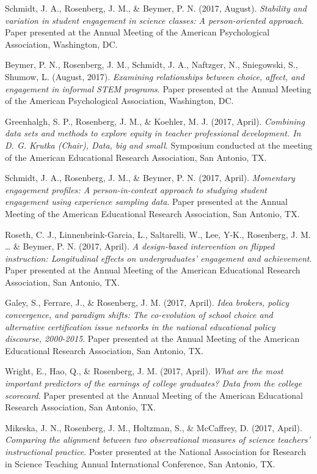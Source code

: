 \documentclass[]{article}
\begin{document}
Schmidt, J. A., Rosenberg, J. M., \& Beymer, P. N. (2017, August).
\emph{Stability and variation in student engagement in science classes:
A person-oriented approach}. Paper presented at the Annual Meeting of
the American Psychological Association, Washington, DC.

Beymer, P. N., Rosenberg, J. M., Schmidt, J. A., Naftzger, N.,
Sniegowski, S., Shumow, L. (August, 2017). \emph{Examining relationships
between choice, affect, and engagement in informal STEM programs}. Paper
presented at the Annual Meeting of the American Psychological
Association, Washington, DC.

Greenhalgh, S. P., Rosenberg, J. M., \& Koehler, M. J. (2017, April).
\emph{Combining data sets and methods to explore equity in teacher
professional development. In D. G. Krutka (Chair), Data, big and small}.
Symposium conducted at the meeting of the American Educational Research
Association, San Antonio, TX.

Schmidt, J. A., Rosenberg, J. M., \& Beymer, P. N. (2017, April).
\emph{Momentary engagement profiles: A person-in-context approach to
studying student engagement using experience sampling data}. Paper
presented at the Annual Meeting of the American Educational Research
Association, San Antonio, TX.

Roseth, C. J., Linnenbrink-Garcia, L., Saltarelli, W., Lee, Y-K.,
Rosenberg, J. M. \ldots{} \& Beymer, P. N. (2017, April). \emph{A
design-based intervention on flipped instruction: Longitudinal effects
on undergraduates' engagement and achievement}. Paper presented at the
Annual Meeting of the American Educational Research Association, San
Antonio, TX.

Galey, S., Ferrare, J., \& Rosenberg, J. M. (2017, April). \emph{Idea
brokers, policy convergence, and paradigm shifts: The co-evolution of
school choice and alternative certification issue networks in the
national educational policy discourse, 2000-2015}. Paper presented at
the Annual Meeting of the American Educational Research Association, San
Antonio, TX.

Wright, E., Hao, Q., \& Rosenberg, J. M. (2017, April). \emph{What are
the most important predictors of the earnings of college graduates? Data
from the college scorecard}. Paper presented at the Annual Meeting of
the American Educational Research Association, San Antonio, TX.

Mikeska, J. N., Rosenberg, J. M., Holtzman, S., \& McCaffrey, D. (2017,
April). \emph{Comparing the alignment between two observational measures
of science teachers' instructional practice}. Poster presented at the
National Association for Research in Science Teaching Annual
International Conference, San Antonio, TX.
\end{document}
